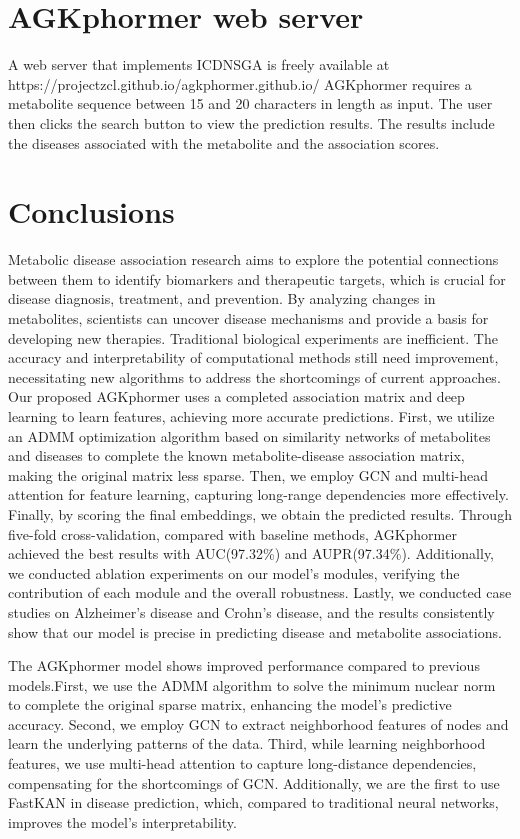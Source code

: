 \documentclass[lettersize,journal]{IEEEtran}
\begin{document}
\section{\textbf{AGKphormer web server}}
A web server that implements ICDNSGA is freely available at https://projectzcl.github.io/agkphormer.github.io/ AGKphormer requires a metabolite sequence between 15 and 20 characters in length as input. The user then clicks the search button to view the prediction results. The results include the diseases associated with the metabolite and the association scores.


\section{\textbf{Conclusions}}\label{sec6}
Metabolic disease association research aims to explore the potential connections between them to identify biomarkers and therapeutic targets, which is crucial for disease diagnosis, treatment, and prevention. By analyzing changes in metabolites, scientists can uncover disease mechanisms and provide a basis for developing new therapies. Traditional biological experiments are inefficient. The accuracy and interpretability of computational methods still need improvement, necessitating new algorithms to address the shortcomings of current approaches. Our proposed AGKphormer uses a completed association matrix and deep learning to learn features, achieving more accurate predictions. First, we utilize an ADMM optimization algorithm based on similarity networks of metabolites and diseases to complete the known metabolite-disease association matrix, making the original matrix less sparse. Then, we employ GCN and multi-head attention for feature learning, capturing long-range dependencies more effectively. Finally, by scoring the final embeddings, we obtain the predicted results. Through five-fold cross-validation, compared with baseline methods, AGKphormer achieved the best results with AUC(97.32\%) and AUPR(97.34\%). Additionally, we conducted ablation experiments on our model's modules, verifying the contribution of each module and the overall robustness. Lastly, we conducted case studies on Alzheimer's disease and Crohn's disease, and the results consistently show that our model is precise in predicting disease and metabolite associations.

The AGKphormer model shows improved performance compared to previous models.First, we use the ADMM algorithm to solve the minimum nuclear norm to complete the original sparse matrix, enhancing the model's predictive accuracy. Second, we employ GCN to extract neighborhood features of nodes and learn the underlying patterns of the data. Third, while learning neighborhood features, we use multi-head attention to capture long-distance dependencies, compensating for the shortcomings of GCN. Additionally, we are the first to use FastKAN in disease prediction, which, compared to traditional neural networks, improves the model's interpretability.
\end{document}
